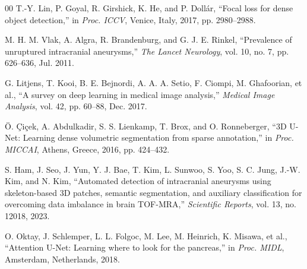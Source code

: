 \documentclass[conference]{IEEEtran}
\begin{document}
\begin{thebibliography}{00}
T.-Y. Lin, P. Goyal, R. Girshick, K. He, and P. Doll\'{a}r, ``Focal loss for dense object detection,'' in \textit{Proc. ICCV}, Venice, Italy, 2017, pp. 2980--2988.

M. H. M. Vlak, A. Algra, R. Brandenburg, and G. J. E. Rinkel, ``Prevalence of unruptured intracranial aneurysms,'' \textit{The Lancet Neurology}, vol. 10, no. 7, pp. 626--636, Jul. 2011.

G. Litjens, T. Kooi, B. E. Bejnordi, A. A. A. Setio, F. Ciompi, M. Ghafoorian, et al., ``A survey on deep learning in medical image analysis,'' \textit{Medical Image Analysis}, vol. 42, pp. 60--88, Dec. 2017.

\"{O}. \c{C}i\c{c}ek, A. Abdulkadir, S. S. Lienkamp, T. Brox, and O. Ronneberger, ``3D U-Net: Learning dense volumetric segmentation from sparse annotation,'' in \textit{Proc. MICCAI}, Athens, Greece, 2016, pp. 424--432.

S. Ham, J. Seo, J. Yun, Y. J. Bae, T. Kim, L. Sunwoo, S. Yoo, S. C. Jung, J.-W. Kim, and N. Kim, ``Automated detection of intracranial aneurysms using skeleton-based 3D patches, semantic segmentation, and auxiliary classification for overcoming data imbalance in brain TOF-MRA,'' \textit{Scientific Reports}, vol. 13, no. 12018, 2023.

O. Oktay, J. Schlemper, L. L. Folgoc, M. Lee, M. Heinrich, K. Misawa, et al., ``Attention U-Net: Learning where to look for the pancreas,'' in \textit{Proc. MIDL}, Amsterdam, Netherlands, 2018.

\end{thebibliography}
\end{document}
